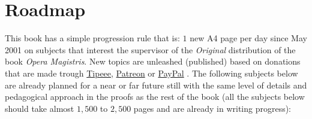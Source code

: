 	\section{Roadmap}
	This book has a simple progression rule that is: $1$ new A4 page per day since May 2001 on subjects that interest the supervisor of the \textit{Original} distribution of the book \textit{Opera Magistris}. New topics are unleashed (published) based on donations that are made trough \href{https://www.tipeee.com/elements-of-applied-mathematics}{Tipeee}, \href{https://www.patreon.com/sciences}{Patreon} or \href{https://www.paypal.me/scientificevolution}{PayPal} . The following subjects below are already planned for a near or far future still with the same level of details and pedagogical approach in the proofs as the rest of the book (all the subjects below should take almost $1,500$ to $2,500$ pages and are already in writing progress):
